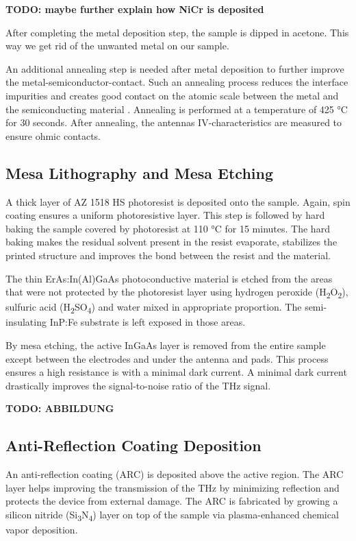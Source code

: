 \textbf{TODO: maybe further explain how NiCr is deposited}

After completing the metal deposition step, the sample is dipped in acetone. This way we get rid of the unwanted metal on our sample. 

An additional annealing step is needed after metal deposition to further improve the metal-semiconductor-contact. Such an annealing process reduces the interface impurities and creates good contact on the atomic scale between the metal and the semiconducting material \cite{tahamtanInvestigationEffectAnnealing2011}. Annealing is performed at a temperature of \num{425} \si{\celsius} for \num{30} seconds. After annealing, the antennas IV-characteristics are measured to ensure ohmic contacts. 

\subsection{Mesa Lithography and Mesa Etching}

A thick layer of AZ 1518 HS photoresist is deposited onto the sample. Again, spin coating ensures a uniform photoresistive layer. This step is followed by hard baking the sample covered by photoresist at \num{110} \si{\celsius} for \num{15} minutes. The hard baking makes the residual solvent present in the resist evaporate, stabilizes the printed structure and improves the bond between the resist and the material. 

The thin ErAs:In(Al)GaAs photoconductive material is etched from the areas that were not protected by the photoresist layer using 
hydrogen peroxide (H\textsubscript{2}O\textsubscript{2}), sulfuric acid (H\textsubscript{2}SO\textsubscript{4}) and water mixed in appropriate proportion. The semi-insulating InP:Fe substrate is left exposed in those areas. 

By mesa etching, the active InGaAs layer is removed from the entire sample except between the electrodes and under the antenna and pads. This process ensures a high resistance is with a minimal dark current. A minimal dark current drastically improves the signal-to-noise ratio of the THz signal. 

\textbf{TODO: ABBILDUNG}

\subsection{Anti-Reflection Coating Deposition}
An anti-reflection coating (ARC) is deposited above the active region. The ARC layer helps improving the transmission of the THz by minimizing reflection \cite{chenAntireflectionImplementationsTerahertz2014} and protects the device from external damage. The ARC is fabricated by growing a silicon nitride (Si\textsubscript{3}N\textsubscript{4}) layer on top of the sample via plasma-enhanced chemical vapor deposition. 

